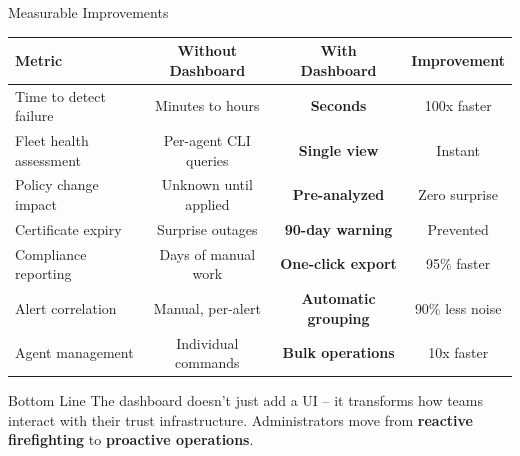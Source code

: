 \begin{frame}{Measurable Improvements}
  \begin{center}
    \tiny
    \begin{tabular}{|p{3.5cm}|c|c|c|}
      \hline
      \textbf{Metric} & \textbf{Without Dashboard} & \textbf{With Dashboard} & \textbf{Improvement} \\
      \hline
      \hline
      Time to detect failure & Minutes to hours & \textbf{Seconds} & \textcolor{successgreen}{100x faster} \\
      \hline
      Fleet health assessment & Per-agent CLI queries & \textbf{Single view} & \textcolor{successgreen}{Instant} \\
      \hline
      Policy change impact & Unknown until applied & \textbf{Pre-analyzed} & \textcolor{successgreen}{Zero surprise} \\
      \hline
      Certificate expiry & Surprise outages & \textbf{90-day warning} & \textcolor{successgreen}{Prevented} \\
      \hline
      Compliance reporting & Days of manual work & \textbf{One-click export} & \textcolor{successgreen}{95\% faster} \\
      \hline
      Alert correlation & Manual, per-alert & \textbf{Automatic grouping} & \textcolor{successgreen}{90\% less noise} \\
      \hline
      Agent management & Individual commands & \textbf{Bulk operations} & \textcolor{successgreen}{10x faster} \\
      \hline
    \end{tabular}
  \end{center}

  \vspace{0.3cm}

  \begin{exampleblock}{Bottom Line}
    \scriptsize
    The dashboard doesn't just add a UI -- it transforms how teams interact with their
    trust infrastructure. Administrators move from \textbf{reactive firefighting} to
    \textbf{proactive operations}.
  \end{exampleblock}
\end{frame}
